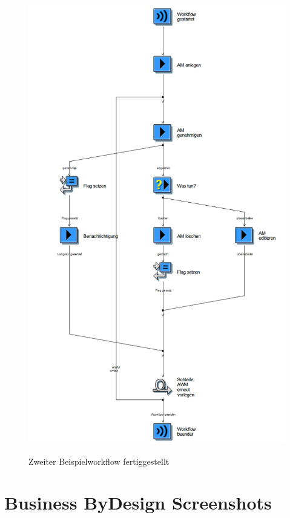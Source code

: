 \begin{figure}[H]
	\begin{center}
	\includegraphics[height=0.95\textheight]{grafiken/wf-builder_bsp2_complete.png}
	\caption{Zweiter Beispielworkflow fertiggestellt}
	\vspace{-10pt}
	\label{abb:workflow-bsp2-complete}
	\end{center}
\end{figure}

\section{Business ByDesign Screenshots}

